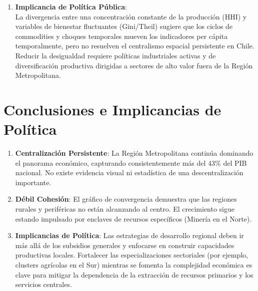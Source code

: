 \documentclass[11pt,a4paper]{article}
\begin{document}
\begin{enumerate}
    \item \textbf{Implicancia de Política Pública}:\\
    La divergencia entre una concentración constante de la producción (HHI) y variables de bienestar fluctuantes (Gini/Theil) sugiere que los ciclos de commodities y choques temporales mueven los indicadores per cápita temporalmente, pero no resuelven el centralismo espacial persistente en Chile. Reducir la desigualdad requiere políticas industriales activas y de diversificación productiva dirigidas a sectores de alto valor fuera de la Región Metropolitana.
\end{enumerate}

\strut

\section{Conclusiones e Implicancias de Política}

\begin{enumerate}
    \item \textbf{Centralización Persistente}: La Región Metropolitana continúa dominando el panorama económico, capturando consistentemente más del 43\% del PIB nacional. No existe evidencia visual ni estadística de una descentralización importante.
    \item \textbf{Débil Cohesión}: El gráfico de convergencia demuestra que las regiones rurales y periféricas no están alcanzando al centro. El crecimiento sigue estando impulsado por enclaves de recursos específicos (Minería en el Norte).
    \item \textbf{Implicancias de Política}: Las estrategias de desarrollo regional deben ir más allá de los subsidios generales y enfocarse en construir capacidades productivas locales. Fortalecer las especializaciones sectoriales (por ejemplo, clusters agrícolas en el Sur) mientras se fomenta la complejidad económica es clave para mitigar la dependencia de la extracción de recursos primarios y los servicios centrales.
\end{enumerate}
\end{document}
